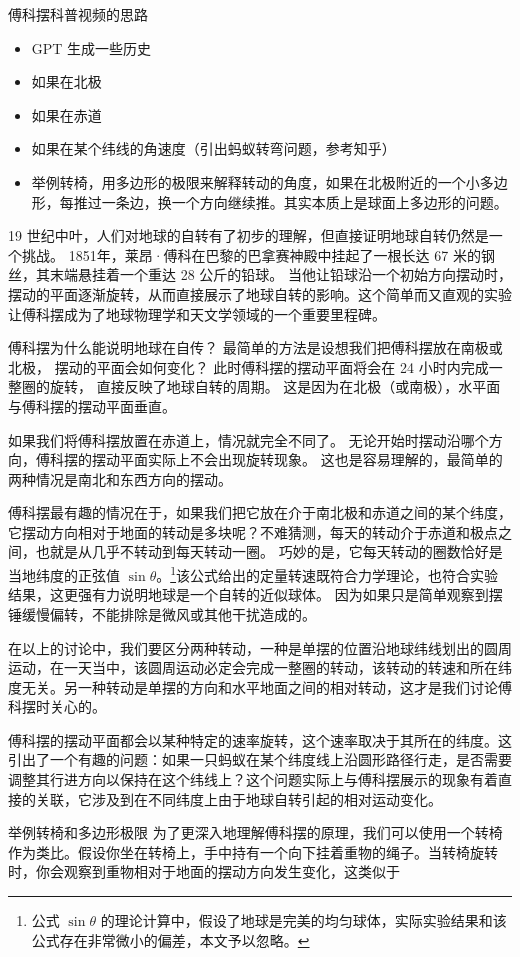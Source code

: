 
\begin{issues}
\issueDraft
\end{issues}

傅科摆科普视频的思路
\begin{itemize}
\item GPT 生成一些历史
\item 如果在北极
\item 如果在赤道
\item 如果在某个纬线的角速度（引出蚂蚁转弯问题，参考知乎）
\item 举例转椅，用多边形的极限来解释转动的角度，如果在北极附近的一个小多边形，每推过一条边，换一个方向继续推。其实本质上是球面上多边形的问题。
\end{itemize}

19 世纪中叶，人们对地球的自转有了初步的理解，但直接证明地球自转仍然是一个挑战。 1851年，莱昂·傅科在巴黎的巴拿赛神殿中挂起了一根长达 67 米的钢丝，其末端悬挂着一个重达 28 公斤的铅球。 当他让铅球沿一个初始方向摆动时，摆动的平面逐渐旋转，从而直接展示了地球自转的影响。这个简单而又直观的实验让傅科摆成为了地球物理学和天文学领域的一个重要里程碑。

傅科摆为什么能说明地球在自传？ 最简单的方法是设想我们把傅科摆放在南极或北极， 摆动的平面会如何变化？ 此时傅科摆的摆动平面将会在 24 小时内完成一整圈的旋转， 直接反映了地球自转的周期。 这是因为在北极（或南极），水平面与傅科摆的摆动平面垂直。

如果我们将傅科摆放置在赤道上，情况就完全不同了。 无论开始时摆动沿哪个方向，傅科摆的摆动平面实际上不会出现旋转现象。 这也是容易理解的，最简单的两种情况是南北和东西方向的摆动。

傅科摆最有趣的情况在于，如果我们把它放在介于南北极和赤道之间的某个纬度，它摆动方向相对于地面的转动是多块呢？不难猜测，每天的转动介于赤道和极点之间，也就是从几乎不转动到每天转动一圈。 巧妙的是，它每天转动的圈数恰好是当地纬度的正弦值 $\sin\theta$。\footnote{公式 $\sin\theta$ 的理论计算中，假设了地球是完美的均匀球体，实际实验结果和该公式存在非常微小的偏差，本文予以忽略。}该公式给出的定量转速既符合力学理论，也符合实验结果，这更强有力说明地球是一个自转的近似球体。 因为如果只是简单观察到摆锤缓慢偏转，不能排除是微风或其他干扰造成的。

在以上的讨论中，我们要区分两种转动，一种是单摆的位置沿地球纬线划出的圆周运动，在一天当中，该圆周运动必定会完成一整圈的转动，该转动的转速和所在纬度无关。另一种转动是单摆的方向和水平地面之间的相对转动，这才是我们讨论傅科摆时关心的。

傅科摆的摆动平面都会以某种特定的速率旋转，这个速率取决于其所在的纬度。这引出了一个有趣的问题：如果一只蚂蚁在某个纬度线上沿圆形路径行走，是否需要调整其行进方向以保持在这个纬线上？这个问题实际上与傅科摆展示的现象有着直接的关联，它涉及到在不同纬度上由于地球自转引起的相对运动变化。

举例转椅和多边形极限
为了更深入地理解傅科摆的原理，我们可以使用一个转椅作为类比。假设你坐在转椅上，手中持有一个向下挂着重物的绳子。当转椅旋转时，你会观察到重物相对于地面的摆动方向发生变化，这类似于
